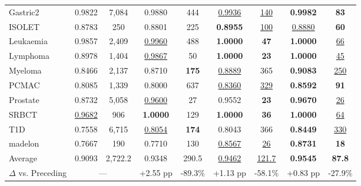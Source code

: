 \begin{table}[t]
\begin{tabular}{lcccccccc}
Gastric2         & 0.9822 & 7{,}084 & 0.9880 & 444 & \underline{0.9936} & \underline{140} & \textbf{0.9982} & \textbf{83} \\
ISOLET           & 0.8783 & 250 & 0.8801 & 225 & \textbf{0.8955} & \underline{100} & \underline{0.8880} & \textbf{60} \\
Leukaemia        & 0.9857 & 2{,}409 & \underline{0.9960} & 488 & \textbf{1.0000} & \textbf{47} & \textbf{1.0000} & \underline{66} \\
Lymphoma         & 0.8978 & 1{,}404 & \underline{0.9867} & 50 & \textbf{1.0000} & \textbf{23} & \textbf{1.0000} & \underline{45} \\
Myeloma          & 0.8466 & 2{,}137 & 0.8710 & \textbf{175} & \underline{0.8889} & 365 & \textbf{0.9083} & \underline{250} \\
PCMAC            & 0.8085 & 1{,}339 & 0.8000 & 637 & \underline{0.8360} & \underline{329} & \textbf{0.8592} & \textbf{91} \\
Prostate         & 0.8732 & 5{,}058 & \underline{0.9600} & 27 & 0.9552 & \textbf{23} & \textbf{0.9670} & \underline{26} \\
SRBCT            & \underline{0.9682} & 906 & \textbf{1.0000} & 129 & \textbf{1.0000} & \textbf{36} & \textbf{1.0000} & \underline{64} \\
T1D              & 0.7558 & 6{,}715 & \underline{0.8054} & \textbf{174} & 0.8043 & 366 & \textbf{0.8449} & \underline{330} \\
madelon          & 0.7667 & 190 & 0.7710 & 130 & \underline{0.8567} & \underline{26} & \textbf{0.8731} & \textbf{18} \\
\midrule
Average          & 0.9093 & 2{,}722.2 & 0.9348 & 290.5 & \underline{0.9462} & \underline{121.7} & \textbf{0.9545} & \textbf{87.8} \\
$\Delta$ vs. Preceding & \multicolumn{2}{c}{—} & +2.55 pp & -89.3\% & +1.13 pp & -58.1\% & +0.83 pp & -27.9\% \\
\bottomrule
\end{tabular}
\end{table}